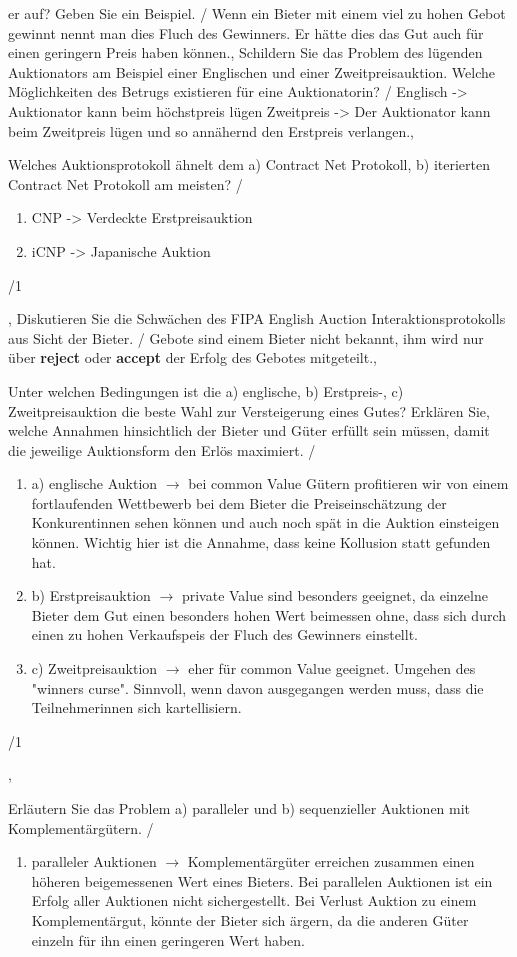 \documentclass[11pt]{article}
\begin{document}
{{{er auf? Geben Sie ein Beispiel.}
/
{
Wenn ein Bieter mit einem viel zu hohen Gebot gewinnt nennt man dies Fluch des Gewinners. Er hätte dies das Gut auch für einen geringern Preis haben können.}},
%
{{Schildern Sie das Problem des lügenden Auktionators am Beispiel einer Englischen und einer Zweitpreisauktion. Welche Möglichkeiten des Betrugs existieren für eine Auktionatorin?}
/
{
Englisch -> Auktionator kann beim höchstpreis lügen
Zweitpreis -> Der Auktionator kann beim Zweitpreis lügen und so annähernd den Erstpreis verlangen.}},
%
{{Welches Auktionsprotokoll ähnelt dem a) Contract Net Protokoll, b) iterierten Contract Net Protokoll am meisten?}
/
{\begin{enumerate}
    \item CNP -> Verdeckte Erstpreisauktion
    \item iCNP -> Japanische Auktion
\end{enumerate}}/1},
%
{{Diskutieren Sie die Schwächen des FIPA English Auction Interaktionsprotokolls aus Sicht der Bieter.}
/
{
Gebote sind einem Bieter nicht bekannt, ihm wird nur über \textbf{reject} oder \textbf{accept} der Erfolg des Gebotes mitgeteilt.}},
%
{{Unter welchen Bedingungen ist die a) englische, b) Erstpreis-, c) Zweitpreisauktion die beste Wahl zur Versteigerung eines Gutes? Erklären Sie, welche Annahmen hinsichtlich der Bieter und Güter erfüllt sein müssen, damit die jeweilige Auktionsform den Erlös maximiert.}
/
{\begin{enumerate}
    \item a) englische Auktion $\to$ bei common Value Gütern profitieren wir von einem fortlaufenden Wettbewerb bei dem Bieter die Preiseinschätzung der Konkurentinnen sehen können und auch noch spät in die Auktion einsteigen können. Wichtig hier ist die Annahme, dass keine Kollusion statt gefunden hat.
    \item b) Erstpreisauktion $\to$ private Value sind besonders geeignet, da einzelne Bieter dem Gut einen besonders hohen Wert beimessen ohne, dass sich durch einen zu hohen Verkaufspeis der Fluch des Gewinners einstellt.
    \item c) Zweitpreisauktion $\to$ eher für common Value geeignet. Umgehen des "winners curse". Sinnvoll, wenn davon ausgegangen werden muss, dass die Teilnehmerinnen sich kartellisiern.
\end{enumerate}}/1},
%
{{Erläutern Sie das Problem a) paralleler und b) sequenzieller Auktionen mit Komplementärgütern.}
/
{\begin{enumerate}
    \item paralleler Auktionen $\to$ Komplementärgüter erreichen zusammen einen höheren beigemessenen Wert eines Bieters. Bei parallelen Auktionen ist ein Erfolg aller Auktionen nicht sichergestellt. Bei Verlust Auktion zu einem Komplementärgut, könnte der Bieter sich ärgern, da die anderen Güter einzeln für ihn einen geringeren Wert haben.

\end{enumerate}}}}
\end{document}

